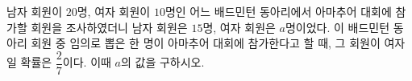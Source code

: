 남자 회원이 $20$명, 여자 회원이 $10$명인 어느 배드민턴 동아리에서 아마추어 대회에 참가할 회원을 조사하였더니 남자 회원은 $15$명, 여자 회원은 $a$명이었다. 이 배드민턴 동아리 회원 중 임의로 뽑은 한 명이 아마추어 대회에 참가한다고 할 때, 그 회원이 여자일 확률은 $\dfrac{2}{7}$이다. 이때 $a$의 값을 구하시오.
